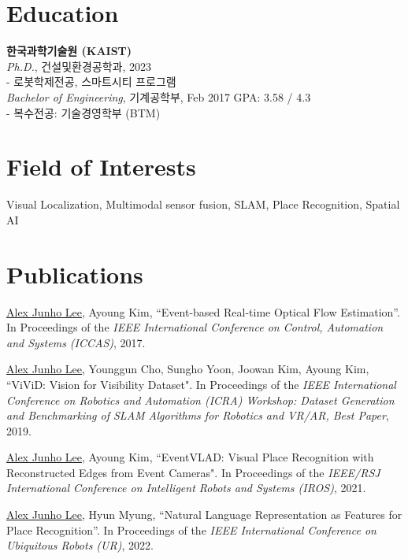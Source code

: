\documentclass[margin]{res}
\begin{document}
	\begin{resume}
		
		\section{Education}
		\textbf{한국과학기술원 (KAIST)}\\
		{\sl Ph.D.}, 건설및환경공학과, 2023
		\\- 로봇학제전공, 스마트시티 프로그램
		\\
		{\sl Bachelor of Engineering}, 기계공학부, Feb 2017
		\hfill GPA: 3.58 / 4.3
		\\- 복수전공: 기술경영학부 (BTM)
				
		\section{Field of Interests}
		Visual Localization, Multimodal sensor fusion, SLAM, Place Recognition, Spatial AI

		\section{Publications}
		
		\par\underline{Alex Junho Lee}, Ayoung Kim, ``Event-based Real-time Optical Flow Estimation''. In Proceedings of the \textit{IEEE International Conference on Control, Automation and Systems (ICCAS)}, 2017.
		
		\par\underline{Alex Junho Lee}, Younggun Cho, Sungho Yoon, Joowan Kim, Ayoung Kim, ``ViViD: Vision for Visibility Dataset". In Proceedings of the \textit{IEEE International Conference on Robotics and Automation (ICRA) Workshop: Dataset Generation and Benchmarking of SLAM Algorithms for Robotics and VR/AR, Best Paper}, 2019.
			
		\par\underline{Alex Junho Lee}, Ayoung Kim, ``EventVLAD: Visual Place Recognition with Reconstructed Edges from Event Cameras". In Proceedings of the \textit{IEEE/RSJ International Conference on Intelligent Robots and Systems (IROS)}, 2021.
			
		\par\underline{Alex Junho Lee}, Hyun Myung, ``Natural Language Representation as Features for Place Recognition''. In Proceedings of the \textit{IEEE International Conference on Ubiquitous Robots (UR)}, 2022.
			

\end{resume}
\end{document}
